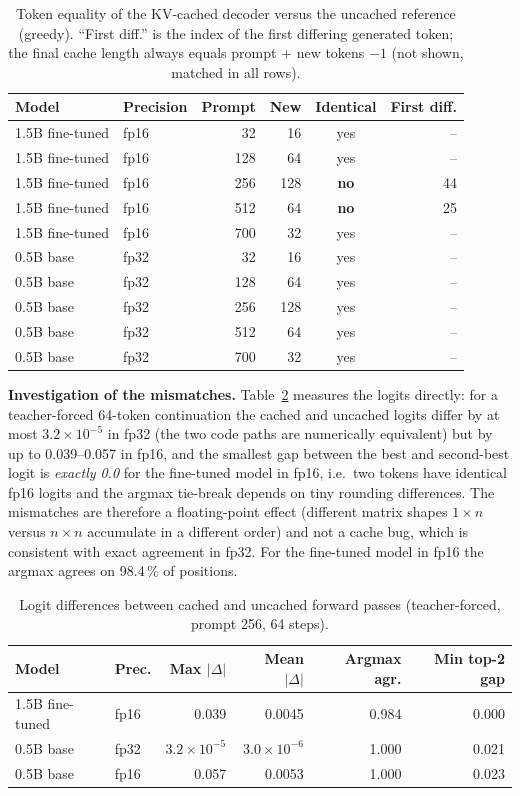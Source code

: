 \begin{table}[t]
\caption{Token equality of the KV-cached decoder versus the uncached reference (greedy). ``First diff.'' is the index of the first differing generated token; the final cache length always equals prompt + new tokens $-1$ (not shown, matched in all rows).}
\label{tab:kvcorr}
\centering\footnotesize
\begin{tabular}{llrrcr}
\hline
Model & Precision & Prompt & New & Identical & First diff. \\
\hline
1.5B fine-tuned & fp16 & 32 & 16 & yes & -- \\
1.5B fine-tuned & fp16 & 128 & 64 & yes & -- \\
1.5B fine-tuned & fp16 & 256 & 128 & \textbf{no} & 44 \\
1.5B fine-tuned & fp16 & 512 & 64 & \textbf{no} & 25 \\
1.5B fine-tuned & fp16 & 700 & 32 & yes & -- \\
0.5B base & fp32 & 32 & 16 & yes & -- \\
0.5B base & fp32 & 128 & 64 & yes & -- \\
0.5B base & fp32 & 256 & 128 & yes & -- \\
0.5B base & fp32 & 512 & 64 & yes & -- \\
0.5B base & fp32 & 700 & 32 & yes & -- \\
\hline
\end{tabular}
\end{table}

\textbf{Investigation of the mismatches.} Table~\ref{tab:kvnum} measures the logits directly: for a teacher-forced 64-token continuation the cached and uncached logits differ by at most $3.2\times10^{-5}$ in fp32 (the two code paths are numerically equivalent) but by up to 0.039--0.057 in fp16, and the smallest gap between the best and second-best logit is \emph{exactly 0.0} for the fine-tuned model in fp16, i.e.\ two tokens have identical fp16 logits and the argmax tie-break depends on tiny rounding differences. The mismatches are therefore a floating-point effect (different matrix shapes $1\times n$ versus $n\times n$ accumulate in a different order) and not a cache bug, which is consistent with exact agreement in fp32. For the fine-tuned model in fp16 the argmax agrees on 98.4\,\% of positions.

\begin{table}[t]
\caption{Logit differences between cached and uncached forward passes (teacher-forced, prompt 256, 64 steps).}
\label{tab:kvnum}
\centering\footnotesize
\begin{tabular}{llrrrr}
\hline
Model & Prec. & Max $|\Delta|$ & Mean $|\Delta|$ & Argmax agr. & Min top-2 gap \\
\hline
1.5B fine-tuned & fp16 & 0.039 & 0.0045 & 0.984 & 0.000 \\
0.5B base & fp32 & $3.2\times10^{-5}$ & $3.0\times10^{-6}$ & 1.000 & 0.021 \\
0.5B base & fp16 & 0.057 & 0.0053 & 1.000 & 0.023 \\
\hline
\end{tabular}
\end{table}

